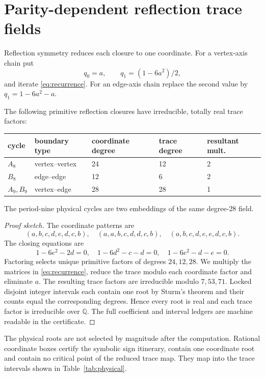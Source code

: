 \section{Parity-dependent reflection trace fields}

Reflection symmetry reduces each closure to one coordinate.  For a
vertex-axis chain put
\[
q_0=a,\qquad q_1=(1-6a^2)/2,
\]
and iterate \eqref{eq:recurrence}.  For an edge-axis chain replace the second
value by \(q_1=1-6a^2-a\).

\begin{theorem}
\label{thm:fields}
The following primitive reflection closures have irreducible, totally real
trace factors:
\begin{center}
\begin{tabular}{@{}lllll@{}}
\toprule
cycle & boundary type & coordinate degree & trace degree & resultant mult.\\
\midrule
\(A_8\) & vertex--vertex & 24 & 12 & 2\\
\(B_8\) & edge--edge & 12 & 6 & 2\\
\(A_9,B_9\) & vertex--edge & 28 & 28 & 1\\
\bottomrule
\end{tabular}
\end{center}
The period-nine physical cycles are two embeddings of the same degree-$28$
field.
\end{theorem}

\begin{proof}[Proof sketch]
The coordinate patterns are
\[
(a,b,c,d,e,d,c,b),\quad
(a,a,b,c,d,d,c,b),\quad
(a,b,c,d,e,e,d,c,b).
\]
The closing equations are
\[
1-6e^2-2d=0,\quad
1-6d^2-c-d=0,\quad
1-6e^2-d-e=0.
\]
Factoring selects unique primitive factors of degrees $24,12,28$.  We
multiply the matrices in \eqref{eq:recurrence}, reduce the trace modulo each
coordinate factor and eliminate $a$.  The resulting trace factors are
irreducible modulo $7,53,71$.  Locked disjoint integer intervals each contain
one root by Sturm's theorem and their counts equal the corresponding degrees.
Hence every root is real and each trace factor is irreducible over
\(\mathbb Q\).  The full coefficient and interval ledgers are machine
readable in the certificate.
\end{proof}

The physical roots are not selected by magnitude after the computation.
Rational coordinate boxes certify the symbolic sign itinerary, contain one
coordinate root and contain no critical point of the reduced trace map.
They map into the trace intervals shown in Table~\ref{tab:physical}.

